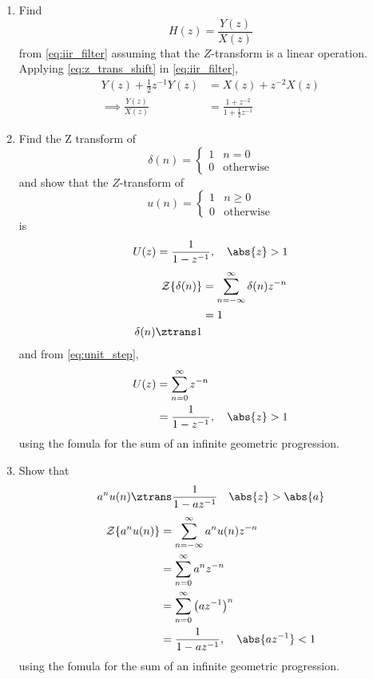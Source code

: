 \documentclass[journal,12pt,twocolumn]{IEEEtran}
\renewcommand\thesection{\arabic{section}}
\begin{document}
\begin{enumerate}[label=\thesection.\arabic*]
\item Find
%
\begin{equation}
H(z) = \frac{Y(z)}{X(z)}
\end{equation}
%
from  \eqref{eq:iir_filter} assuming that the $Z$-transform is a linear operation.
\\
\solution  Applying \eqref{eq:z_trans_shift} in \eqref{eq:iir_filter},
\begin{align}
Y(z) + \frac{1}{2}z^{-1}Y(z) &= X(z)+z^{-2}X(z)
\\
\implies \frac{Y(z)}{X(z)} &= \frac{1 + z^{-2}}{1 + \frac{1}{2}z^{-1}}
\label{eq:freq_resp}
\end{align}
%
\item Find the Z transform of 
\begin{equation}
\delta(n)
=
\begin{cases}
1 & n = 0
\\
0 & \text{otherwise}
\end{cases}
\end{equation}
and show that the $Z$-transform of
\begin{equation}
\label{eq:unit_step}
u(n)
=
\begin{cases}
1 & n \ge 0
\\
0 & \text{otherwise}
\end{cases}
\end{equation}
is
\begin{equation}
U(z) = \frac{1}{1-z^{-1}}, \quad \abs{z} > 1
\end{equation}
\solution 
\begin{align}
     {\mathcal {Z}}\{\delta(n)\} &=\sum _{n=-\infty }^{\infty }\delta(n)z^{-n} \\
     &= 1 \\
\delta(n) \ztrans 1
\end{align}
and from \eqref{eq:unit_step},
\begin{align}
U(z) &= \sum _{n= 0}^{\infty}z^{-n}
\\
&=\frac{1}{1-z^{-1}}, \quad \abs{z} > 1
\end{align}
using the fomula for the sum of an infinite geometric progression.
%
\item Show that 
\begin{equation}
     \label{eq:anun}
     a^nu(n) \ztrans \frac{1}{1-az^{-1}} \quad \abs{z} > \abs{a}
\end{equation}
\solution 
\begin{align}
     {\mathcal {Z}}\{a^nu(n)\} &=\sum _{n=-\infty }^{\infty }a^nu(n)z^{-n} \\
     &= \sum _{n=0}^{\infty }a^nz^{-n} \\
     &= \sum _{n=0}^{\infty } \left(az^{-1}\right)^n \\
     &= \frac{1}{1-az^{-1}}, \quad \abs{az^{-1}} < 1
\end{align}
using the fomula for the sum of an infinite geometric progression.



\end{enumerate}
\end{document}
